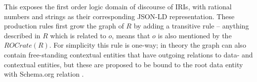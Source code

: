 This exposes the first order logic domain of discourse of IRIs, with rational numbers and strings as their corresponding JSON-LD representation. These production rules first grow the graph of $R$ by adding a transitive rule – anything described in $R$ which is related to $o$, means that $o$ is also mentioned by the $ROCrate(R)$. For simplicity this rule is one-way; in theory the graph can also contain free-standing contextual entities that have outgoing relations to data- and contextual entities, but these are proposed to be bound to the root data entity with Schema.org relation .
